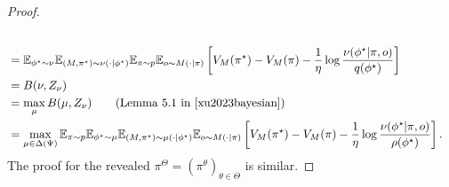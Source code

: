 \begin{proof}
\begin{align*}
    \\&= \E_{\phi^\star \sim \nu}\E_{(M, \pi^\star) \sim \nu(\cdot|\phi^\star)}\E_{\pi \sim p}\E_{o \sim M(\cdot|\pi)}\left[V_M(\pi^\star) - V_M(\pi) - \frac{1}{\eta}\log\frac{\nu(\phi^\star|\pi, o)}{q(\phi^\star)}\right]
    \\&= B(\nu, Z_{\nu})
    \\&= \max_{\mu} B(\mu, Z_{\nu})  \tag{Lemma 5.1 in \cite{xu2023bayesian}}
    \\&= \max_{\mu \in \Delta(\Psi)}\E_{\pi\sim p}\E_{\phi^\star \sim \mu}\E_{(M, \pi^\star) \sim \mu(\cdot|\phi^\star)} \E_{o\sim M(\cdot|\pi)}\left[ V_{M}(\pi^\star) -  V_{M}(\pi) - \frac{1}{\eta} \log\frac{\nu(\phi^\star|\pi, o)}{\rho(\phi^\star)} \right].
\end{align*}
The proof for the revealed $\pi^{\Theta}=(\pi^\theta)_{\theta\in\Theta}$ is similar.
\end{proof}
